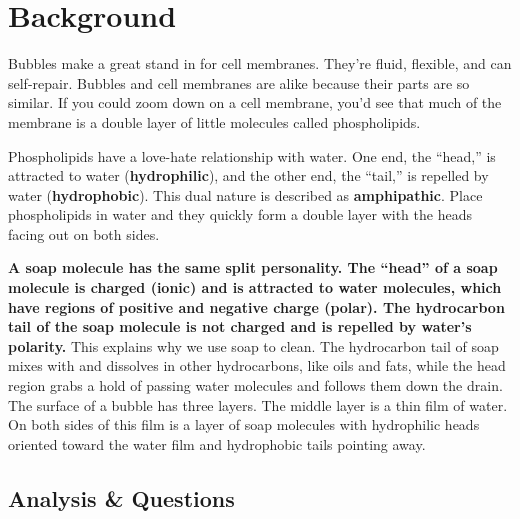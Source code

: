 \documentclass[letterpaper]{article}
\newcommand{\titleDOC}{}
\newcommand{\authorDOC}{Daniel Sabalakov}
\newcommand{\classDOC}{}
\begin{document}








\renewcommand{\authorDOC}{Daniel Sabalakov}

\renewcommand{\classDOC}{DE Intro to Biology I}

\renewcommand{\titleDOC}{Bubble Lab Exploration}



\newpage

\section{Background}\label{background}

Bubbles make a great stand in for cell membranes. They're fluid, flexible, and can self-repair. Bubbles and cell membranes are alike because their parts are so similar. If you could zoom down on a cell membrane, you'd see that much of the membrane is a double layer of little molecules called phospholipids.

Phospholipids have a love-hate relationship with water. One end, the ``head,'' is attracted to water (\textbf{hydrophilic}), and the other end, the ``tail,'' is repelled by water (\textbf{hydrophobic}). This dual nature is described as \textbf{amphipathic}. Place phospholipids in water and they quickly form a double layer with the heads facing out on both sides.

\textbf{A soap molecule has the same split personality. The ``head'' of a soap molecule is charged (ionic) and is attracted to water molecules, which have regions of positive and negative charge (polar). The hydrocarbon tail of the soap molecule is not charged and is repelled by water's polarity.} This explains why we use soap to clean. The hydrocarbon tail of soap mixes with and dissolves in other hydrocarbons, like oils and fats, while the head region grabs a hold of passing water molecules and follows them down the drain. The surface of a bubble has three layers. The middle layer is a thin film of water. On both sides of this film is a layer of soap molecules with hydrophilic heads oriented toward the water film and hydrophobic tails pointing away.

\subsection*{Analysis \& Questions}\label{analysis-questions}
\end{document}
